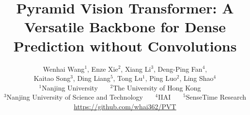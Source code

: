 \documentclass[10pt,twocolumn,letterpaper]{article}
\begin{document}
\title{Pyramid Vision Transformer: A Versatile Backbone for Dense Prediction without Convolutions}


\author{
    Wenhai Wang$^{1}$, 
    Enze Xie$^{2}$,
    Xiang Li$^{3}$,
    Deng-Ping Fan$^{4}$\textsuperscript{\Letter}, \\
    Kaitao Song$^{3}$,
    Ding Liang$^{5}$,
    Tong Lu$^{1}$\textsuperscript{\Letter},
    Ping Luo$^{2}$,
    Ling Shao$^{4}$\\
    $^1$Nanjing University~~~
    $^2$The University of Hong Kong~~~\\
    $^3$Nanjing University of Science and Technology~~~
    $^4$IIAI~~~
    $^5$SenseTime Research\\
    {\small \url{https://github.com/whai362/PVT}}
}


\ificcvfinal\thispagestyle{empty}\fi
\end{document}
